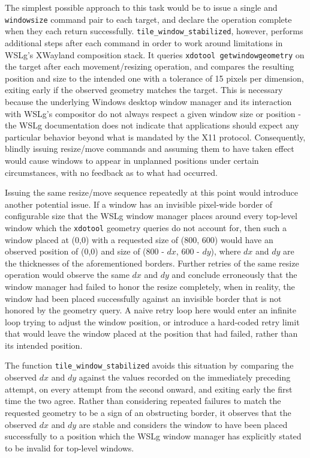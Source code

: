 The simplest possible approach to this task would be to issue a single  and \texttt{window\-size} command pair to each target, and declare the operation complete when they each return successfully. \texttt{tile\_window\_stabilized}, however, performs additional steps after each command in order to work around limitations in WSLg's XWayland composition stack. It queries \texttt{xdotool getwindowgeometry} on the target after each movement/resizing operation, and compares the resulting position and size to the intended one with a tolerance of 15 pixels per dimension, exiting early if the observed geometry matches the target. This is necessary because the underlying Windows desktop window manager and its interaction with WSLg's compositor do not always respect a given window size or position - the WSLg documentation does not indicate that applications should expect any particular behavior beyond what is mandated by the X11 protocol. Consequently, blindly issuing resize/move commands and assuming them to have taken effect would cause windows to appear in unplanned positions under certain circumstances, with no feedback as to what had occurred.

Issuing the same resize/move sequence repeatedly at this point would introduce another potential issue. If a window has an invisible pixel-wide border of configurable size that the WSLg window manager places around every top-level window which the \texttt{xdotool} geometry queries do not account for, then such a window placed at (0,0) with a requested size of (800, 600) would have an observed position of (0,0) and size of (800 - $dx$, 600 - $dy$), where $dx$ and $dy$ are the thicknesses of the aforementioned borders. Further retries of the same resize operation would observe the same $dx$ and $dy$ and conclude erroneously that the window manager had failed to honor the resize completely, when in reality, the window had been placed successfully against an invisible border that is not honored by the geometry query. A naive retry loop here would enter an infinite loop trying to adjust the window position, or introduce a hard-coded retry limit that would leave the window placed at the position that had failed, rather than its intended position.

The function \texttt{tile\_window\_stabilized} avoids this situation by comparing the observed $dx$ and $dy$ against the values recorded on the immediately preceding attempt, on every attempt from the second onward, and exiting early the first time the two agree. Rather than considering repeated failures to match the requested geometry to be a sign of an obstructing border, it observes that the observed $dx$ and $dy$ are stable and considers the window to have been placed successfully to a position which the WSLg window manager has explicitly stated to be invalid for top-level windows.

